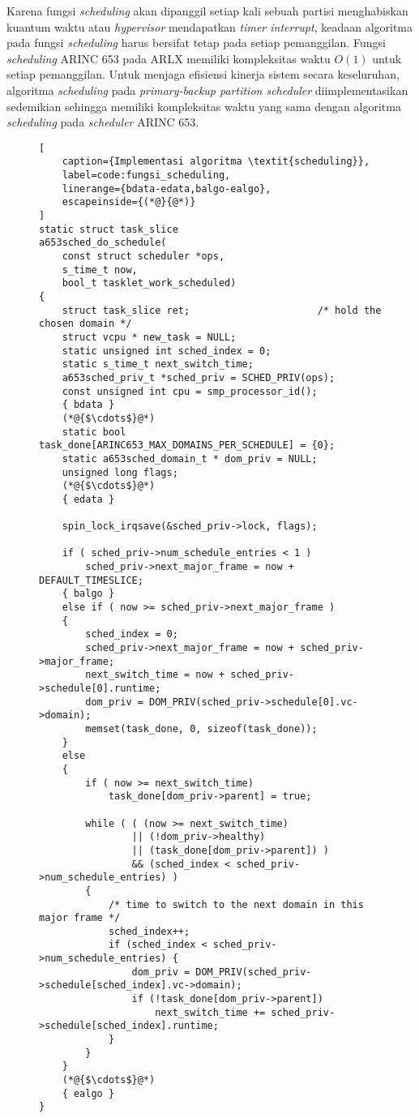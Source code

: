 Karena fungsi \textit{scheduling} akan dipanggil setiap kali sebuah partisi menghabiskan kuantum
waktu atau \textit{hypervisor} mendapatkan \textit{timer interrupt}, keadaan algoritma pada
fungsi \textit{scheduling} harus bersifat tetap pada setiap pemanggilan. Fungsi
\textit{scheduling} ARINC 653 pada ARLX memiliki kompleksitas waktu $O(1)$ untuk setiap
pemanggilan. Untuk menjaga efisiensi kinerja sistem secara keseluruhan, algoritma
\textit{scheduling} pada \textit{primary-backup partition scheduler} diimplementasikan
sedemikian sehingga memiliki kompleksitas waktu yang sama dengan algoritma \textit{scheduling}
pada \textit{scheduler} ARINC 653.

\begin{figure}
\begin{lstlisting}[
	caption={Implementasi algoritma \textit{scheduling}},
	label=code:fungsi_scheduling,
	linerange={bdata-edata,balgo-ealgo},
	escapeinside={(*@}{@*)}
]
static struct task_slice
a653sched_do_schedule(
    const struct scheduler *ops,
    s_time_t now,
    bool_t tasklet_work_scheduled)
{
    struct task_slice ret;                      /* hold the chosen domain */
    struct vcpu * new_task = NULL;
    static unsigned int sched_index = 0;
    static s_time_t next_switch_time;
    a653sched_priv_t *sched_priv = SCHED_PRIV(ops);
    const unsigned int cpu = smp_processor_id();
    { bdata }
    (*@{$\cdots$}@*)
    static bool task_done[ARINC653_MAX_DOMAINS_PER_SCHEDULE] = {0};
    static a653sched_domain_t * dom_priv = NULL;
    unsigned long flags;
    (*@{$\cdots$}@*)
    { edata }

    spin_lock_irqsave(&sched_priv->lock, flags);

    if ( sched_priv->num_schedule_entries < 1 )
        sched_priv->next_major_frame = now + DEFAULT_TIMESLICE;
    { balgo }
    else if ( now >= sched_priv->next_major_frame )
    {
        sched_index = 0;
        sched_priv->next_major_frame = now + sched_priv->major_frame;
        next_switch_time = now + sched_priv->schedule[0].runtime;
        dom_priv = DOM_PRIV(sched_priv->schedule[0].vc->domain);
        memset(task_done, 0, sizeof(task_done));
    }
    else
    {
        if ( now >= next_switch_time) 
            task_done[dom_priv->parent] = true;

        while ( ( (now >= next_switch_time)
                || (!dom_priv->healthy)
                || (task_done[dom_priv->parent]) )
                && (sched_index < sched_priv->num_schedule_entries) )
        {
            /* time to switch to the next domain in this major frame */
            sched_index++;
            if (sched_index < sched_priv->num_schedule_entries) {
                dom_priv = DOM_PRIV(sched_priv->schedule[sched_index].vc->domain);
                if (!task_done[dom_priv->parent])
                    next_switch_time += sched_priv->schedule[sched_index].runtime;
            }
        }
    }
    (*@{$\cdots$}@*)
    { ealgo }
}
\end{lstlisting}
\end{figure}

